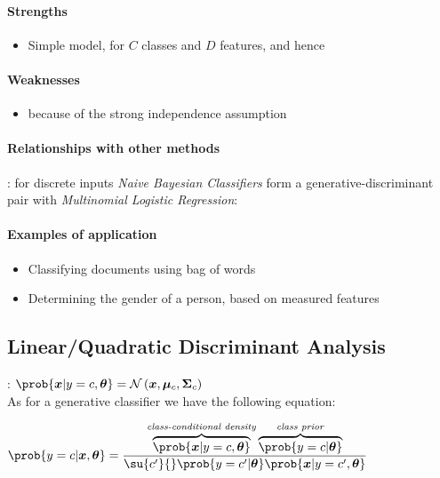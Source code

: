 \paragraph{Strengths}
\begin{itemize}
    \item Simple model, for $C$ classes and $D$ features, and hence 
\end{itemize}

\paragraph{Weaknesses}
\begin{itemize}
    \item {} because of the strong independence assumption
\end{itemize}

\paragraph{Relationships with other methods}
: for discrete inputs 
\emph{Naive Bayesian Classifiers} form a 
generative-discriminant pair with \emph{Multinomial Logistic
Regression}: 

\paragraph{Examples of application}
\begin{itemize}
    \item Classifying documents using bag of words
    \item Determining the gender of a person, based on measured features 
\end{itemize}


\subsection{Linear/Quadratic Discriminant Analysis}
: $\prob{\bm{x}|y=c,\bm{\theta}} = \mathcal{N}
\left(\bm{x}, \bm{\mu}_{c},\bm{\Sigma}_{c}\right)$\\
As for a generative classifier we have the following equation: 
\begin{center}
    $\prob{y=c|\bm{x},\bm{\theta}} = \dfrac{\overbrace{\prob{\bm{x}|y=c,
        \bm{\theta}}}^{\text{\emph{class-conditional density}}}
        \overbrace{\prob{y=c|\bm{\theta}}}^{\text{\emph{class prior}}}}{
    \su{c'}{}\prob{y=c'|\bm{\theta}} \prob{\bm{x}|y=c',\bm{\theta}}}$
\end{center}
